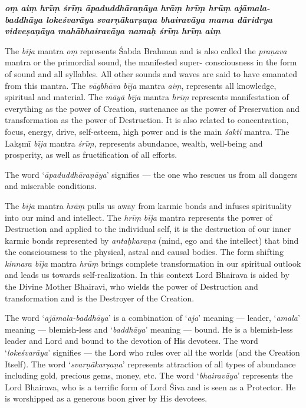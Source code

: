 \documentclass[11pt,oneside,a4paper]{article}
\newenvironment{shloka}[1]
  {\bigskip\center#1\varwidth{\linewidth}}
  {\endvarwidth\endcenter\bigskip}
\newcommand{\tl}[1]{\emph{#1}}
\begin{document}
\begin{shloka}\itshape\bfseries
  oṃ aiṃ hrīṃ śrīṃ āpaduddhāraṇāya hrāṃ hrīṃ hrūṃ ajāmala-baddhāya lokeśvarāya
  svarṇākarṣaṇa bhairavāya mama dāridrya vidveṣaṇāya mahābhairavāya namaḥ
  śrīṃ hrīṃ aiṃ
\end{shloka}

The \tl{bīja} mantra \tl{oṃ} represents Śabda Brahman and is also called
the \tl{praṇava} mantra or the primordial sound, the manifested super-
consciousness in the form of sound and all syllables. All other sounds and waves
are said to have emanated from this mantra. The \tl{vāgbhāva bīja} mantra
\tl{aiṃ}, represents all knowledge, spiritual and material. The \tl{māyā bīja}
mantra \tl{hrīṃ} represents manifestation of everything as the power of Creation,
sustenance as the power of Preservation and transformation as the power of
Destruction. It is also related to concentration, focus, energy, drive,
self-esteem, high power and is the main \tl{śakti} mantra. The Lakṣmī \tl{bīja}
mantra \tl{śrīṃ}, represents abundance, wealth, well-being and prosperity,
as well as fructification of all efforts.

The word ‘\tl{āpaduddhāraṇāya}’ signifies — the one who rescues us from all
dangers and miserable conditions.

The \tl{bīja} mantra \tl{hrāṃ} pulls us away from karmic bonds and infuses
spirituality into our mind and intellect. The \tl{hrīṃ} \tl{bīja} mantra
represents the power of Destruction and applied to the individual self, it is
the destruction of our inner karmic bonds represented by \tl{antaḥkaraṇa} (mind,
ego and the intellect) that bind the consciousness to the physical, astral and
causal bodies. The form shifting \tl{kinnara bīja} mantra \tl{hrūṃ} brings
complete transformation in our spiritual outlook and leads us towards
self-realization. In this context Lord Bhairava is aided by the Divine Mother
Bhairavi, who wields the power of Destruction and transformation and is
the Destroyer of the Creation.

The word ‘\tl{ajāmala-baddhāya}’ is a combination of ‘\tl{aja}’ meaning —
leader, ‘\tl{amala}’ meaning — blemish-less and ‘\tl{baddhāya}’ meaning — bound.
He is a blemish-less leader and Lord and bound to the devotion of His devotees.
The word ‘\tl{lokeśvarāya}’ signifies — the Lord who rules over all the worlds
(and the Creation Itself). The word ‘\tl{svarṇākarṣaṇa}’ represents attraction
of all types of abundance including gold, precious gems, money, etc.
The word ‘\tl{bhairavāya}’ represents the Lord Bhairava, who is a terrific form
of Lord Śiva and is seen as a Protector. He is worshipped as a generous boon
giver by His devotees.
\end{document}
